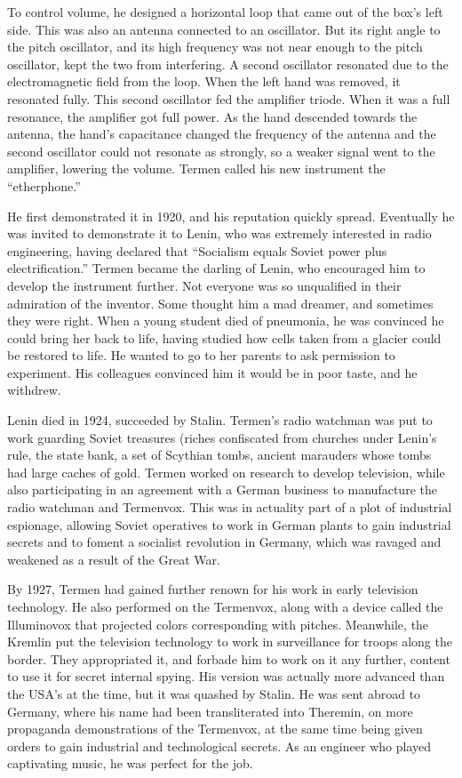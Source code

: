To control volume, he designed a horizontal loop that came out of the box's left side. This was also an antenna connected to an oscillator. But its right angle to the pitch oscillator, and its high frequency was not near enough to the pitch oscillator, kept the two from interfering. A second oscillator resonated due to the electromagnetic field from the loop. When the left hand was removed, it resonated fully. This second oscillator fed the amplifier triode. When it was a full resonance, the amplifier got full power. As the hand descended towards the antenna, the hand's capacitance changed the frequency of the antenna and the second oscillator could not resonate as strongly, so a weaker signal went to the amplifier, lowering the volume. Termen called his new instrument the ``etherphone.''

He first demonstrated it in 1920, and his reputation quickly spread. Eventually he was invited to demonstrate it to Lenin, who was extremely interested in radio engineering, having declared that ``Socialism equals Soviet power plus electrification.'' Termen became the darling of Lenin, who encouraged him to develop the instrument further. Not everyone was so unqualified in their admiration of the inventor. Some thought him a mad dreamer, and sometimes they were right. When a young student died of pneumonia, he was convinced he could bring her back to life, having studied how cells taken from a glacier could be restored to life. He wanted to go to her parents to ask permission to experiment. His colleagues convinced him it would be in poor taste, and he withdrew.

Lenin died in 1924, succeeded by Stalin. Termen's radio watchman was put to work guarding Soviet treasures (riches confiscated from churches under Lenin's rule, the state bank, a set of Scythian tombs, ancient marauders whose tombs had large caches of gold.
Termen worked on research to develop television, while also participating in an agreement with a German business to manufacture the radio watchman and Termenvox. This was in actuality part of a plot of industrial espionage, allowing Soviet operatives to work in German plants to gain industrial secrets and to foment a socialist revolution in Germany, which was ravaged and weakened as a result of the Great War.

By 1927, Termen had gained further renown for his work in early television technology. He also performed on the Termenvox, along with a device called the Illuminovox that projected colors corresponding with pitches. Meanwhile, the Kremlin put the television technology to work in surveillance for troops along the border. They appropriated it, and forbade him to work on it any further, content to use it for secret internal spying. His version was actually more advanced than the USA's at the time, but it was quashed by Stalin. He was sent abroad to Germany, where his name had been transliterated into Theremin, on more propaganda demonstrations of the Termenvox, at the same time being given orders to gain industrial and technological secrets. As an engineer who played captivating music, he was perfect for the job.

